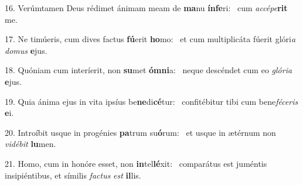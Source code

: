 16. Verúmtamen Deus rédimet ánimam meam de \textbf{ma}nu \textbf{ín}\textbf{fe}ri: \ast\  cum \textit{ac}\textit{cé}\textit{pe}\textbf{rit} me.\

17. Ne timúeris, cum dives factus \textbf{fú}erit \textbf{ho}mo: \ast\  et cum multiplicáta fúerit glóri\textit{a} \textit{do}\textit{mus} \textbf{e}jus.\

18. Quóniam cum interíerit, non \textbf{su}met \textbf{óm}\textbf{ni}a: \ast\  neque descéndet cum eo \textit{gló}\textit{ri}\textit{a} \textbf{e}jus.\

19. Quia ánima ejus in vita ipsíus be\textbf{ne}di\textbf{cé}tur: \ast\  confitébitur tibi cum bene\textit{fé}\textit{ce}\textit{ris} \textbf{e}i.\

20. Introíbit usque in progénies \textbf{pa}trum su\textbf{ó}rum: \ast\  et usque in ætérnum non \textit{vi}\textit{dé}\textit{bit} \textbf{lu}men.\

21. Homo, cum in honóre esset, non \textbf{in}tel\textbf{lé}xit: \ast\  comparátus est juméntis insipiéntibus, et símilis \textit{fac}\textit{tus} \textit{est} \textbf{il}lis.\

